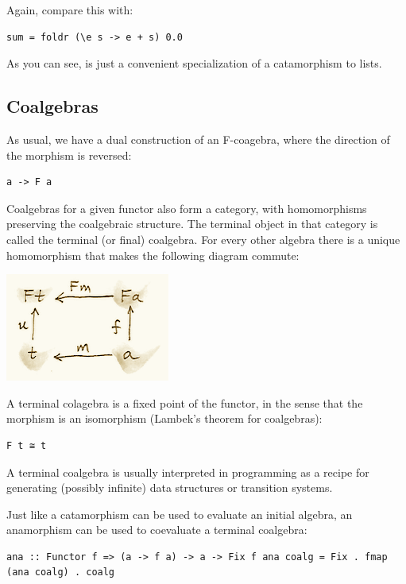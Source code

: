 Again, compare this with:

\begin{verbatim}
sum = foldr (\e s -> e + s) 0.0
\end{verbatim}

As you can see,  is just a convenient specialization of a
catamorphism to lists.

\subsection{Coalgebras}\label{coalgebras}

As usual, we have a dual construction of an F-coagebra, where the
direction of the morphism is reversed:

\begin{verbatim}
a -> F a
\end{verbatim}

Coalgebras for a given functor also form a category, with homomorphisms
preserving the coalgebraic structure. The terminal object
 in that category is called the terminal (or final)
coalgebra. For every other algebra  there is a unique
homomorphism  that makes the following diagram commute:

\includegraphics{images/alg7.png}

A terminal colagebra is a fixed point of the functor, in the sense that
the morphism  is an isomorphism
(Lambek's theorem for coalgebras):

\begin{verbatim}
F t ≅ t
\end{verbatim}

A terminal coalgebra is usually interpreted in programming as a recipe
for generating (possibly infinite) data structures or transition
systems.

Just like a catamorphism can be used to evaluate an initial algebra, an
anamorphism can be used to coevaluate a terminal coalgebra:

\begin{verbatim}
ana :: Functor f => (a -> f a) -> a -> Fix f ana coalg = Fix . fmap (ana coalg) . coalg
\end{verbatim}

